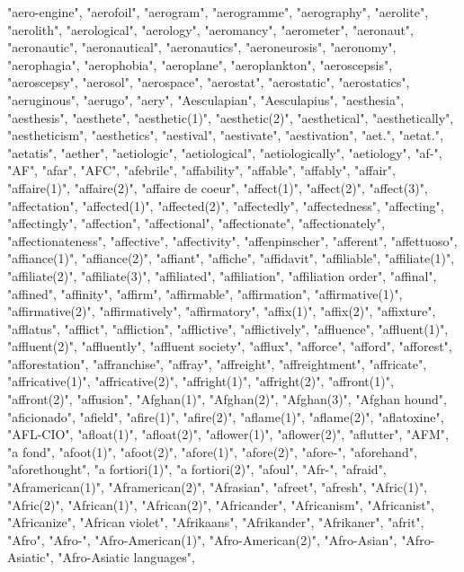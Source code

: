 "aero-engine",
"aerofoil",
"aerogram",
"aerogramme",
"aerography",
"aerolite",
"aerolith",
"aerological",
"aerology",
"aeromancy",
"aerometer",
"aeronaut",
"aeronautic",
"aeronautical",
"aeronautics",
"aeroneurosis",
"aeronomy",
"aerophagia",
"aerophobia",
"aeroplane",
"aeroplankton",
"aeroscepsis",
"aeroscepsy",
"aerosol",
"aerospace",
"aerostat",
"aerostatic",
"aerostatics",
"aeruginous",
"aerugo",
"aery",
"Aesculapian",
"Aesculapius",
"aesthesia",
"aesthesis",
"aesthete",
"aesthetic(1)",
"aesthetic(2)",
"aesthetical",
"aesthetically",
"aestheticism",
"aesthetics",
"aestival",
"aestivate",
"aestivation",
"aet.",
"aetat.",
"aetatis",
"aether",
"aetiologic",
"aetiological",
"aetiologically",
"aetiology",
"af-",
"AF",
"afar",
"AFC",
"afebrile",
"affability",
"affable",
"affably",
"affair",
"affaire(1)",
"affaire(2)",
"affaire de coeur",
"affect(1)",
"affect(2)",
"affect(3)",
"affectation",
"affected(1)",
"affected(2)",
"affectedly",
"affectedness",
"affecting",
"affectingly",
"affection",
"affectional",
"affectionate",
"affectionately",
"affectionateness",
"affective",
"affectivity",
"affenpinscher",
"afferent",
"affettuoso",
"affiance(1)",
"affiance(2)",
"affiant",
"affiche",
"affidavit",
"affiliable",
"affiliate(1)",
"affiliate(2)",
"affiliate(3)",
"affiliated",
"affiliation",
"affiliation order",
"affinal",
"affined",
"affinity",
"affirm",
"affirmable",
"affirmation",
"affirmative(1)",
"affirmative(2)",
"affirmatively",
"affirmatory",
"affix(1)",
"affix(2)",
"affixture",
"afflatus",
"afflict",
"affliction",
"afflictive",
"afflictively",
"affluence",
"affluent(1)",
"affluent(2)",
"affluently",
"affluent society",
"afflux",
"afforce",
"afford",
"afforest",
"afforestation",
"affranchise",
"affray",
"affreight",
"affreightment",
"affricate",
"affricative(1)",
"affricative(2)",
"affright(1)",
"affright(2)",
"affront(1)",
"affront(2)",
"affusion",
"Afghan(1)",
"Afghan(2)",
"Afghan(3)",
"Afghan hound",
"aficionado",
"afield",
"afire(1)",
"afire(2)",
"aflame(1)",
"aflame(2)",
"aflatoxine",
"AFL-CIO",
"afloat(1)",
"afloat(2)",
"aflower(1)",
"aflower(2)",
"aflutter",
"AFM",
"a fond",
"afoot(1)",
"afoot(2)",
"afore(1)",
"afore(2)",
"afore-",
"aforehand",
"aforethought",
"a fortiori(1)",
"a fortiori(2)",
"afoul",
"Afr-",
"afraid",
"Aframerican(1)",
"Aframerican(2)",
"Afrasian",
"afreet",
"afresh",
"Afric(1)",
"Afric(2)",
"African(1)",
"African(2)",
"Africander",
"Africanism",
"Africanist",
"Africanize",
"African violet",
"Afrikaans",
"Afrikander",
"Afrikaner",
"afrit",
"Afro",
"Afro-",
"Afro-American(1)",
"Afro-American(2)",
"Afro-Asian",
"Afro-Asiatic",
"Afro-Asiatic languages",
